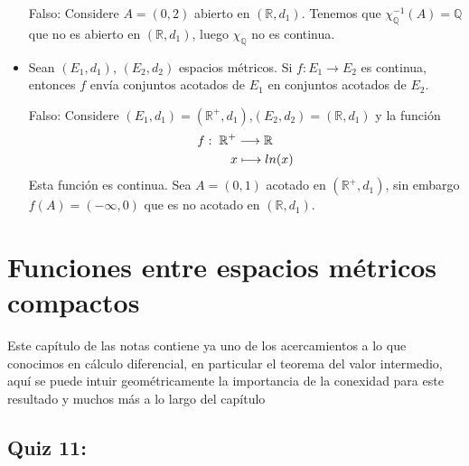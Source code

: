 \begin{itemize}[leftmargin=*]
Falso: Considere $A=(0,2)$ abierto en $(\mathbb{R},d_1)$. Tenemos que $\chi_{\mathbb{Q}}^{-1}(A)=\mathbb{Q}$ que no es abierto en $(\mathbb{R},d_1)$, luego $\chi_{\mathbb{Q}}$ no es continua.

\item Sean $(E_1,d_1)$, $(E_2,d_2)$ espacios métricos. Si $f: E_1 \longrightarrow E_2$ es continua, entonces $f$ envía conjuntos acotados de $E_1$ en conjuntos acotados de $E_2$.

Falso: Considere $(E_1,d_1)=(\mathbb{R}^+,d_1)$,$(E_2,d_2)=(\mathbb{R},d_1)$ y la función
    \begin{align*}
        f: \hspace{2mm} &\mathbb{R}^+ \longrightarrow \mathbb{R}\\
        &\hspace*{0.32cm}x \longmapsto ln(x)
    \end{align*}
Esta función es continua. Sea $A=(0,1)$ acotado en $(\mathbb{R}^+,d_1)$, sin embargo $f(A)=(-\infty,0)$ que es no acotado en $(\mathbb{R},d_1)$.

\end{itemize}

\section{Funciones entre espacios métricos compactos}

Este capítulo de las notas contiene ya uno de los acercamientos a lo que conocimos en cálculo diferencial, en particular el teorema del valor intermedio, aquí se puede intuir geométricamente la importancia de  la conexidad para este resultado y muchos más a lo largo del capítulo

\subsection{Quiz 11:}

